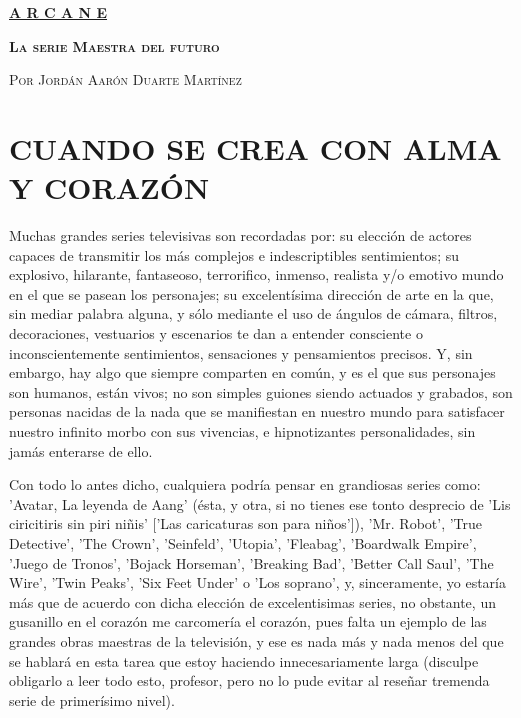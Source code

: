 \documentclass[11pt,A5]{article}
\begin{document}
\pagecolor{black}
\color{white}


\begin{center}
    {\textcolor{doradu_mamalun}{\textbf{\textsc{\underline{\Huge{A R C A N E}}}}}}
\end{center}

\begin{center}
    {\textcolor{doradu_mamalun}{\textbf{\textsc{\large{La serie Maestra del futuro}}}}}
\end{center}

\begin{center}
    {\textcolor{doradu_semimamalun}{\textsc{Por Jordán Aarón Duarte Martínez}}}
\end{center}

\section*{\Large{\textsf{\hspace{1.8cm}CUANDO SE CREA CON ALMA Y CORAZÓN}}}

Muchas grandes series televisivas son recordadas por: su elección de actores capaces de transmitir los más complejos e indescriptibles sentimientos; su explosivo, hilarante, fantaseoso, terrorifico, inmenso, realista y/o emotivo mundo en el que se pasean los personajes; su excelentísima dirección de arte en la que, sin mediar palabra alguna, y sólo mediante el uso de ángulos de cámara, filtros, decoraciones, vestuarios y escenarios te dan a entender consciente o inconscientemente sentimientos, sensaciones y pensamientos precisos. Y, sin embargo, hay algo que siempre comparten en común, y es el que sus personajes son humanos, están vivos; no son simples guiones siendo actuados y grabados, son personas nacidas de la nada que se manifiestan en nuestro mundo para satisfacer nuestro infinito morbo con sus vivencias, e hipnotizantes personalidades, sin jamás enterarse de ello.\newline

Con todo lo antes dicho, cualquiera podría pensar en grandiosas series como: 'Avatar, La leyenda de Aang' (ésta, y otra, si no tienes ese tonto desprecio de 'Lis ciricitiris sin piri niñis' ['Las caricaturas son para niños']), 'Mr. Robot', 'True Detective', 'The Crown', 'Seinfeld', 'Utopia', 'Fleabag', 'Boardwalk Empire', 'Juego de Tronos', 'Bojack Horseman', 'Breaking Bad', 'Better Call Saul', 'The Wire', 'Twin Peaks', 'Six Feet Under' o 'Los soprano', y, sinceramente, yo estaría más que de acuerdo con dicha elección de excelentisimas series, no obstante, un gusanillo en el corazón me carcomería el corazón, pues falta un ejemplo de las grandes obras maestras de la televisión, y ese es nada más y nada menos del que se hablará en esta tarea que estoy haciendo innecesariamente larga (disculpe obligarlo a leer todo esto, profesor, pero no lo pude evitar al reseñar tremenda serie de primerísimo nivel).\newline
\end{document}
